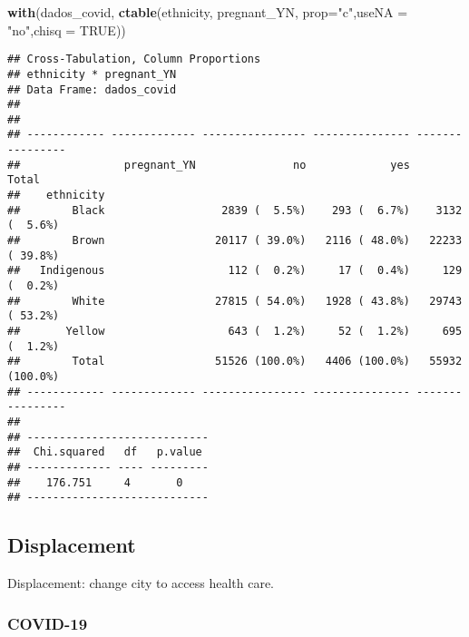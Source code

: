 \documentclass[
]{article}
\newenvironment{Shaded}{\begin{snugshade}}{\end{snugshade}}
\newcommand{\DataTypeTok}[1]{\textcolor[rgb]{0.13,0.29,0.53}{#1}}
\newcommand{\KeywordTok}[1]{\textcolor[rgb]{0.13,0.29,0.53}{\textbf{#1}}}
\newcommand{\NormalTok}[1]{#1}
\newcommand{\OtherTok}[1]{\textcolor[rgb]{0.56,0.35,0.01}{#1}}
\newcommand{\StringTok}[1]{\textcolor[rgb]{0.31,0.60,0.02}{#1}}
\begin{document}
\begin{Shaded}
\begin{Highlighting}[]
\KeywordTok{with}\NormalTok{(dados_covid, }\KeywordTok{ctable}\NormalTok{(ethnicity, pregnant_YN, }\DataTypeTok{prop=}\StringTok{"c"}\NormalTok{,}\DataTypeTok{useNA =} \StringTok{"no"}\NormalTok{,}\DataTypeTok{chisq =} \OtherTok{TRUE}\NormalTok{))}
\end{Highlighting}
\end{Shaded}

\begin{verbatim}
## Cross-Tabulation, Column Proportions  
## ethnicity * pregnant_YN  
## Data Frame: dados_covid  
## 
## 
## ------------ ------------- ---------------- --------------- ----------------
##                pregnant_YN               no             yes            Total
##    ethnicity                                                                
##        Black                  2839 (  5.5%)    293 (  6.7%)    3132 (  5.6%)
##        Brown                 20117 ( 39.0%)   2116 ( 48.0%)   22233 ( 39.8%)
##   Indigenous                   112 (  0.2%)     17 (  0.4%)     129 (  0.2%)
##        White                 27815 ( 54.0%)   1928 ( 43.8%)   29743 ( 53.2%)
##       Yellow                   643 (  1.2%)     52 (  1.2%)     695 (  1.2%)
##        Total                 51526 (100.0%)   4406 (100.0%)   55932 (100.0%)
## ------------ ------------- ---------------- --------------- ----------------
## 
## ----------------------------
##  Chi.squared   df   p.value 
## ------------- ---- ---------
##    176.751     4       0    
## ----------------------------
\end{verbatim}

\hypertarget{displacement}{%
\subsection{Displacement}\label{displacement}}

Displacement: change city to access health care.

\hypertarget{covid-19-3}{%
\subsubsection{COVID-19}\label{covid-19-3}}
\end{document}
